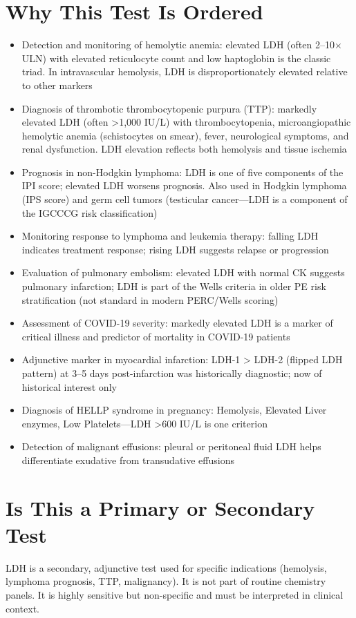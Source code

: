 \section*{Why This Test Is Ordered}
\begin{itemize}
  \item Detection and monitoring of hemolytic anemia: elevated LDH (often 2--10$\times$ ULN) with elevated reticulocyte count and low haptoglobin is the classic triad. In intravascular hemolysis, LDH is disproportionately elevated relative to other markers
  \item Diagnosis of thrombotic thrombocytopenic purpura (TTP): markedly elevated LDH (often >1,000 IU/L) with thrombocytopenia, microangiopathic hemolytic anemia (schistocytes on smear), fever, neurological symptoms, and renal dysfunction. LDH elevation reflects both hemolysis and tissue ischemia
  \item Prognosis in non-Hodgkin lymphoma: LDH is one of five components of the IPI score; elevated LDH worsens prognosis. Also used in Hodgkin lymphoma (IPS score) and germ cell tumors (testicular cancer---LDH is a component of the IGCCCG risk classification)
  \item Monitoring response to lymphoma and leukemia therapy: falling LDH indicates treatment response; rising LDH suggests relapse or progression
  \item Evaluation of pulmonary embolism: elevated LDH with normal CK suggests pulmonary infarction; LDH is part of the Wells criteria in older PE risk stratification (not standard in modern PERC/Wells scoring)
  \item Assessment of COVID-19 severity: markedly elevated LDH is a marker of critical illness and predictor of mortality in COVID-19 patients
  \item Adjunctive marker in myocardial infarction: LDH-1 > LDH-2 (flipped LDH pattern) at 3--5 days post-infarction was historically diagnostic; now of historical interest only
  \item Diagnosis of HELLP syndrome in pregnancy: Hemolysis, Elevated Liver enzymes, Low Platelets---LDH >600 IU/L is one criterion
  \item Detection of malignant effusions: pleural or peritoneal fluid LDH helps differentiate exudative from transudative effusions
\end{itemize}

\section*{Is This a Primary or Secondary Test}
LDH is a secondary, adjunctive test used for specific indications (hemolysis, lymphoma prognosis, TTP, malignancy). It is not part of routine chemistry panels. It is highly sensitive but non-specific and must be interpreted in clinical context.


